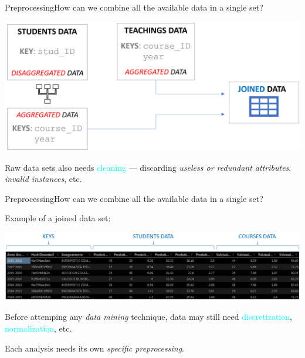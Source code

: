 \begin{frame}{Preprocessing}{How can we combine all the available data in a single set?}

    \vspace{0.5cm}
    \begin{centering}
        \hspace*{-0.5cm}\includegraphics[scale=0.21]{img8.png}
    \end{centering}

        Raw data sets also needs \textcolor{cyan}{cleaning} --- discarding \emph{useless or redundant attributes}, \emph{invalid instances}, etc.

\end{frame}

\begin{frame}{Preprocessing}{How can we combine all the available data in a single set?}

    \alert{Example of a joined data set:}\\

    \vspace{0.35cm}

    \begin{centering}
        \hspace*{-0.65cm}\includegraphics[scale=0.2]{prepr2.png}
    \end{centering}

    Before attemping any \emph{data mining} technique, data may still need \textcolor{cyan}{discretization}, \textcolor{cyan}{normalization}, etc. \\

 \vspace{0.5cm}

    Each analysis needs its own \emph{specific preprocessing}.

\end{frame}